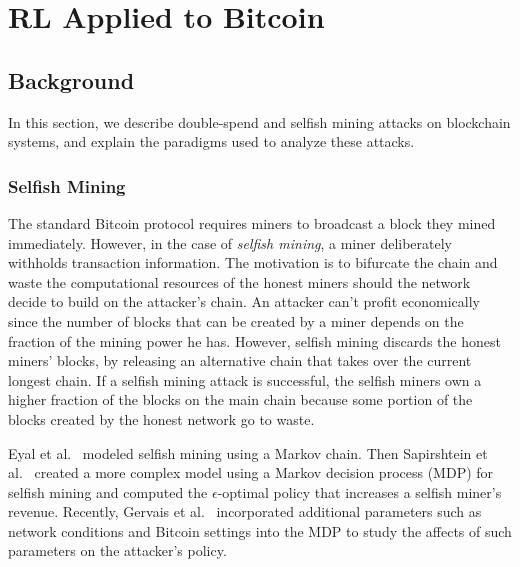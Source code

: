 \chapter{RL Applied to Bitcoin}\label{selfishRL}

\section{Background}
In this section, we describe double-spend and selfish mining attacks on blockchain systems, and explain the paradigms used to analyze these attacks.

\subsection{Selfish Mining}

The standard Bitcoin protocol requires miners to broadcast a block they mined immediately. However, in the case of {\em selfish mining}, a miner deliberately withholds transaction information. The motivation is to bifurcate the chain and waste the computational resources of the honest miners should the network decide to build on the attacker's chain. An attacker can't profit economically since the number of blocks that can be created by a miner depends on the fraction of the mining power he has. However, selfish mining discards the honest miners' blocks, by releasing an alternative chain that takes over the current longest chain. If a selfish mining attack is successful, the selfish miners own a higher fraction of the blocks on the main chain because some portion of the blocks created by the honest network go to waste.

Eyal et al.~\cite{eyal:2014} modeled selfish mining using a Markov chain. Then Sapirshtein et al.~\cite{sapirshtein:2015} created a more complex model using a Markov decision process (MDP) for selfish mining and computed the $\epsilon$-optimal policy that increases a selfish miner's revenue. Recently, Gervais et al.~\cite{Gervais:2016} incorporated additional parameters such as network conditions and Bitcoin settings into the MDP to study the affects of such parameters on the attacker's policy. %

